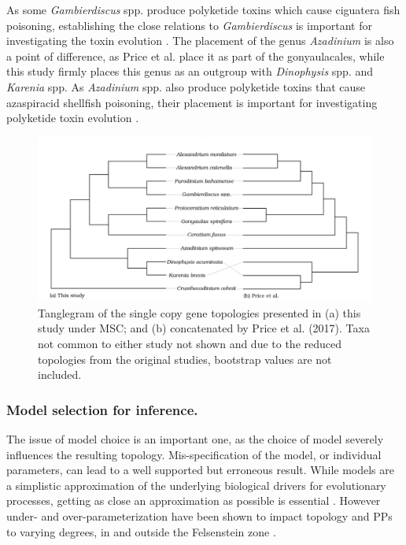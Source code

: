 \documentclass[12pt]{article}
\begin{document}
As some \emph{Gambierdiscus} spp. produce polyketide toxins which cause ciguatera fish poisoning, establishing the close relations to \emph{Gambierdiscus} is important for investigating the toxin evolution \cite{pawlowiez2014transcriptome}.
The placement of the genus \emph{Azadinium} is also a point of difference, as Price et al. place it as part of the gonyaulacales, while this study firmly places this genus as an outgroup with \emph{Dinophysis} spp. and \emph{Karenia} spp.
As \emph{Azadinium} spp. also produce polyketide toxins that cause azaspiracid shellfish poisoning, their placement is important for investigating polyketide toxin evolution \cite{meyer2015transcriptomic}.
 
\begin{figure} 
\includegraphics[scale=.23]{figures/Price-comparison.png}
\caption{Tanglegram of the single copy gene topologies presented in (a) this study under MSC; and (b) concatenated by Price et al. (2017). Taxa not common to either study not shown and due to the reduced topologies from the original studies, bootstrap values are not included.} 
\label{fig:tangle}
\end{figure} 
\FloatBarrier
\subsubsection{Model selection for inference.} The issue of model choice is an important one, as the choice of model severely influences the resulting topology. 
Mis-specification of the model, or individual parameters, can lead to a well supported but erroneous result. 
While models are a simplistic approximation of the underlying biological drivers for evolutionary processes, getting as close an approximation as possible is essential \cite{box1979all}. 
However under- and over-parameterization have been shown to impact topology and PPs to varying degrees, in and outside the Felsenstein zone \cite{lemmon2004importance}. 
\end{document}
